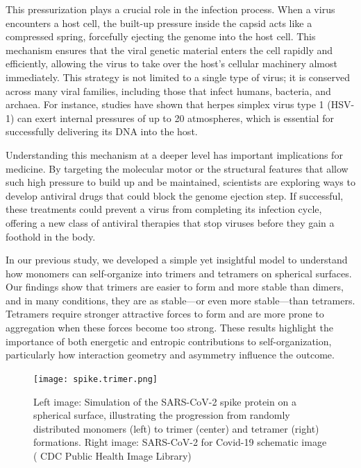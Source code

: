 \documentclass[12pt]{article}
\begin{document}
\begin{flushleft}
This pressurization plays a crucial role in the infection process. When a virus encounters a host cell, the built-up pressure inside the capsid acts like a compressed spring, forcefully ejecting the genome into the host cell. This mechanism ensures that the viral genetic material enters the cell rapidly and efficiently, allowing the virus to take over the host’s cellular machinery almost immediately. This strategy is not limited to a single type of virus; it is conserved across many viral families, including those that infect humans, bacteria, and archaea. For instance, studies have shown that herpes simplex virus type 1 (HSV-1) can exert internal pressures of up to 20 atmospheres, which is essential for successfully delivering its DNA into the host.

Understanding this mechanism at a deeper level has important implications for medicine. By targeting the molecular motor or the structural features that allow such high pressure to build up and be maintained, scientists are exploring ways to develop antiviral drugs that could block the genome ejection step. If successful, these treatments could prevent a virus from completing its infection cycle, offering a new class of antiviral therapies that stop viruses before they gain a foothold in the body. 






In our previous study, we developed a simple yet insightful model to understand how monomers can self-organize into trimers and tetramers on spherical surfaces. Our findings show that trimers are easier to form and more stable than dimers, and in many conditions, they are as stable—or even more stable—than tetramers. Tetramers require stronger attractive forces to form and are more prone to aggregation when these forces become too strong. These results highlight the importance of both energetic and entropic contributions to self-organization, particularly how interaction geometry and asymmetry influence the outcome.

\begin{figure}[!ht]
  \centering
  \texttt{[image: spike.trimer.png]}
  \caption{Left image: Simulation of the SARS-CoV-2 spike protein on a spherical surface, illustrating the progression from randomly distributed monomers (left) to trimer (center) and tetramer (right) formations. Right image: SARS-CoV-2 for Covid-19 schematic image ( CDC Public
Health Image Library) \cite{cdc-covid}}
\end{figure}






\end{flushleft}
\end{document}
